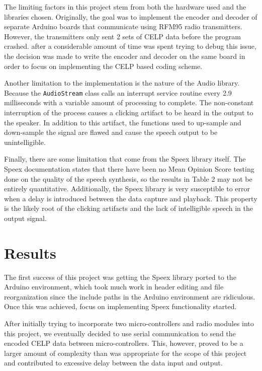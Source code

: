 \documentclass[letterpaper]{article}
\begin{document}
The limiting factors in this project stem from both the hardware used and the libraries chosen. Originally, the goal was to implement the encoder and decoder of separate Arduino boards that communicate using RFM95 radio transmitters. However, the transmitters only sent 2 sets of CELP data before the program crashed. after a considerable amount of time was spent trying to debug this issue, the decision was made to write the encoder and decoder on the same board in order to focus on implementing the CELP based coding scheme.

Another limitation to the implementation is the nature of the Audio library. Because the \texttt{AudioStream} class calls an interrupt service routine every 2.9 milliseconds with a variable amount of processing to complete. The non-constant interruption of the process causes a clicking artifact to be heard in the output to the speaker. In addition to this artifact, the functions used to up-sample and down-sample the signal are flawed and cause the speech output to be unintelligible.

Finally, there are some limitation that come from the Speex library itself. The Speex documentation states that there have been no Mean Opinion Score testing done on the quality of the speech synthesis, so the results in Table 2 may not be entirely quantitative. Additionally, the Speex library is very susceptible to error when a delay is introduced between the data capture and playback. This property is the likely root of the clicking artifacts and the lack of intelligible speech in the output signal.

\section{Results}

The first success of this project was getting the Speex library ported to the Arduino environment, which took much work in header editing and file reorganization since the include paths in the Arduino environment are ridiculous. Once this was achieved, focus on implementing Speex functionality started.

After initially trying to incorporate two micro-controllers and radio modules into this project, we eventually decided to use serial communication to send the encoded CELP data between micro-controllers. This, however, proved to be a larger amount of complexity than was appropriate for the scope of this project and contributed to excessive delay between the data input and output.
\end{document}
